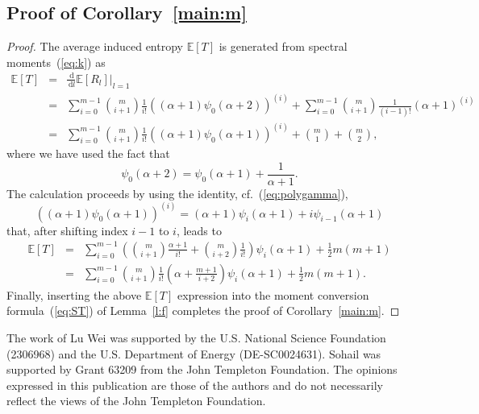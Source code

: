 \documentclass[pdflatex,sn-mathphys-num]{sn-jnl}%
\theoremstyle{thmstyleone}
\newcommand{\dd}{\,\mathrm{d}}
\begin{document}
\subsection{Proof of Corollary~\ref{main:m}}\label{sec:C1}
\begin{proof}
The average induced entropy $\mathbb{E}[T]$ is generated from spectral moments~(\ref{eq:k}) as
\begin{eqnarray}
\mathbb{E}[T] &=& \frac{\dd}{\dd l}\mathbb{E}\left[R_{l}\right]\!\big|_{l=1} \\
&=& \sum_{i=0}^{m-1}\binom{m}{i+1}\frac{1}{i!}\left((\alpha+1)\psi_{0}(\alpha+2)\right)^{(i)} + \sum_{i=0}^{m-1}\binom{m}{i+1}\frac{1}{(i-1)!}\left(\alpha+1\right)^{(i)} \\
&=& \sum_{i=0}^{m-1}\binom{m}{i+1}\frac{1}{i!}\left((\alpha+1)\psi_{0}(\alpha+1)\right)^{(i)} + \binom{m}{1} + \binom{m}{2},
\end{eqnarray}
where we have used the fact that 
\begin{equation}
\psi_{0}(\alpha+2)=\psi_{0}(\alpha+1)+\frac{1}{\alpha+1}.
\end{equation}
The calculation proceeds by using the identity, cf.~(\ref{eq:polygamma}),
\begin{equation}
\left((\alpha+1)\psi_{0}(\alpha+1)\right)^{(i)}=(\alpha+1)\psi_{i}(\alpha+1)+i\psi_{i-1}(\alpha+1)
\end{equation}
that, after shifting index $i-1$ to $i$, leads to
\begin{eqnarray}
\mathbb{E}[T] &=& \sum_{i=0}^{m-1}\left(\binom{m}{i+1}\frac{\alpha+1}{i!}+\binom{m}{i+2}\frac{1}{i!}\right)\psi_{i}(\alpha+1) + \frac{1}{2}m(m+1) \\
&=& \sum_{i=0}^{m-1}\binom{m}{i+1}\frac{1}{i!}\left(\alpha+\frac{m+1}{i+2}\right)\psi_{i}(\alpha+1)+\frac{1}{2}m(m+1).
\end{eqnarray}
Finally, inserting the above $\mathbb{E}[T]$ expression into the moment conversion formula~(\ref{eq:ST}) of Lemma~\ref{l:f} completes the proof of Corollary~\ref{main:m}.
\end{proof}

\backmatter
{} The work of Lu Wei was supported by the U.S. National Science Foundation (2306968) and the U.S. Department of Energy (DE-SC0024631). Sohail was supported by Grant 63209 from the John Templeton Foundation. The opinions expressed in this publication are those of the authors and do not necessarily reflect the views of the John Templeton Foundation. \\
\end{document}
